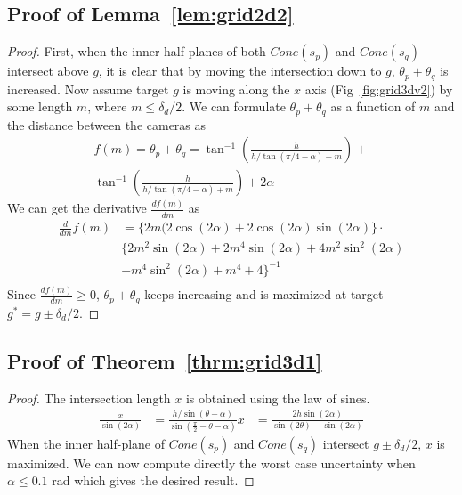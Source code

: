 \subsection{Proof of Lemma~\ref{lem:grid2d2}}
\begin{proof}
 First, when the inner half planes of both $Cone(s_p)$ and $Cone(s_q)$ intersect above $g$, it is clear that by moving the intersection down to $g$, $\theta_p + \theta_q$ is increased.
Now assume target $g$ is moving along the $x$ axis (Fig~\ref{fig:grid3dv2}) by some length $m$, where $m \leq \delta_d/2$. 
We can formulate $\theta_p + \theta_q$ as a function of $m$ and the distance between the cameras as 
\begin{align*}
f(m) = \theta_p + \theta_q = \tan^{-1}(\frac{h}{h/\tan(\pi/4-\alpha) - m}) + \\
 \tan^{-1}(\frac{h}{h/\tan(\pi/4-\alpha) + m}) + 2\alpha
\end{align*}
We can get the derivative $\frac{df(m)}{dm}$ as 
\begin{align*}
\frac{d}{dm} f(m) &= \{2m(2\cos(2\alpha)+2\cos(2\alpha)\sin(2\alpha)\} \cdot \\ &\{2m^2\sin(2\alpha)+2m^4\sin(2\alpha)+4m^2\sin^2(2\alpha) \\
&+m^4\sin^2(2\alpha)+m^4+4\}^{-1}\\
\end{align*}
Since $\frac{df(m)}{dm} \geq 0$, $\theta_p + \theta_q$ keeps increasing and is maximized  at target $g^* = g \pm \delta_d/2$.
\end{proof}

\subsection{Proof of Theorem~\ref{thrm:grid3d1}}
\begin{proof}
The intersection length $x$ is obtained using the law of sines. 
\begin{align*}
\frac{x}{\sin(2\alpha)} &= \frac{h/\sin(\theta-\alpha)}{\sin(\frac{\pi}{2} - \theta - \alpha)}
		x &=\frac{2h\sin(2\alpha)}{\sin(2\theta)-\sin(2\alpha)}
\end{align*}
When the inner half-plane of $Cone(s_p)$ and $Cone(s_q)$ intersect $g \pm \delta_d/2$, $x$ is maximized.
We can now compute directly the worst case uncertainty when $\alpha \leq 0.1$ rad which gives the desired result.
\end{proof} 

